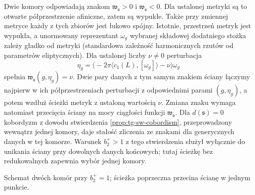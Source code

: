 Dwie komory odpowiadają znakom
$\mathfrak w_{\mathfrak s}>0$ i $\mathfrak w_{\mathfrak s}<0$.
Dla ustalonej metryki są to otwarte półprzestrzenie
afiniczne, zatem są wypukłe. Także przy zmiennej
metryce każdy z tych zbiorów jest łukowo spójny.
Istotnie, przestrzeń metryk jest wypukła, a
unormowany reprezentant $\omega_g$ wybranej
składowej dodatniego stożka zależy gładko od metryki
(standardowa zależność harmonicznych rzutów od
parametrów eliptycznych). Dla ustalonej liczby
$\nu\ne0$ perturbacja
\[
\eta_g=\bigl(-2\pi\langle c_1(L),[\omega_g]\rangle
-\nu\bigr)\omega_g
\]
spełnia $\mathfrak w_{\mathfrak s}(g,\eta_g)=\nu$.
Dwie pary danych z tym samym znakiem ściany
łączymy najpierw w ich półprzestrzeniach perturbacji
z odpowiednimi parami $(g,\eta_g)$, a potem
wzdłuż ścieżki metryk z ustaloną wartością $\nu$.
Zmiana znaku wymaga natomiast przecięcia ściany
na mocy ciągłości funkcji $\mathfrak w_{\mathfrak s}$.
Dla $d(\mathfrak s)=0$ kobordyzm z dowodu stwierdzenia
\ref{prop:tg-sw-cobordism}, przeprowadzony wewnątrz
jednej komory, daje stałość zliczenia ze znakami
dla generycznych danych w tej komorze.
Warunek $b_2^+>1$ z tego stwierdzenia służył
wyłącznie do unikania ściany przy dowolnych
danych końcowych; tutaj ścieżkę bez redukowalnych
zapewnia wybór jednej komory.

\begin{center}

{\footnotesize Schemat dwóch komór przy $b_2^+=1$; ścieżka poprzeczna
przecina ścianę w jednym punkcie.}
\end{center}

